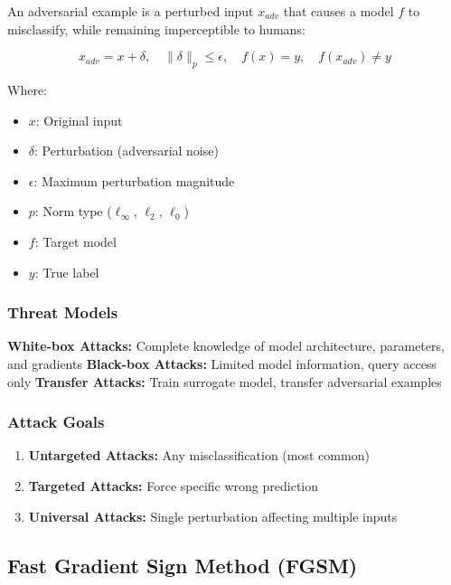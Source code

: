 \documentclass[conference]{IEEEtran}
\begin{document}
An adversarial example is a perturbed input $x_{adv}$ that causes a model $f$ to misclassify, while remaining imperceptible to humans:

\begin{equation}
x_{adv} = x + \delta, \quad \|\delta\|_p \leq \epsilon, \quad f(x) = y, \quad f(x_{adv}) \neq y
\end{equation}

Where:
\begin{itemize}
  \item $x$: Original input
  \item $\delta$: Perturbation (adversarial noise)
  \item $\epsilon$: Maximum perturbation magnitude
  \item $p$: Norm type ($\ell_\infty$, $\ell_2$, $\ell_0$)
  \item $f$: Target model
  \item $y$: True label
\end{itemize}

\subsubsection{Threat Models}
\label{sec:q4_threat_models}

\textbf{White-box Attacks:} Complete knowledge of model architecture, parameters, and gradients
\textbf{Black-box Attacks:} Limited model information, query access only
\textbf{Transfer Attacks:} Train surrogate model, transfer adversarial examples

\subsubsection{Attack Goals}
\label{sec:q4_attack_goals}

\begin{enumerate}[label=\arabic*.]
  \item \textbf{Untargeted Attacks:} Any misclassification (most common)
  \item \textbf{Targeted Attacks:} Force specific wrong prediction
  \item \textbf{Universal Attacks:} Single perturbation affecting multiple inputs
\end{enumerate}

\subsection{Fast Gradient Sign Method (FGSM)}
\label{sec:q4_fgsm}
\end{document}
